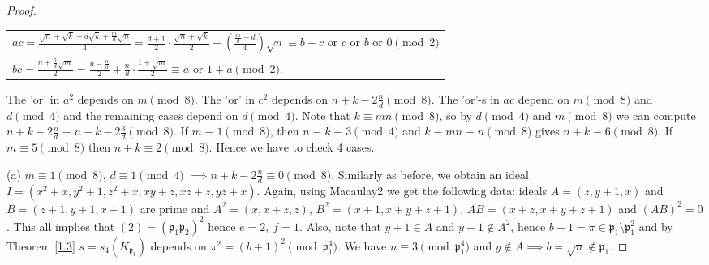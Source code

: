 \documentclass[12pt]{article}
\theoremstyle{remark}
\begin{document}
\begin{proof}
\begin{center}
\begin{tabular}{@{}l@{}}
$ac = \frac{\sqrt{n} + \sqrt{k} + d\sqrt{k} + \frac{m}{d} \sqrt{n} }{4} =  \frac{d+1}{2} \cdot \frac{\sqrt{n}+\sqrt{k}}{2} + (\frac{\frac{m}{d}-d}{4})\sqrt{n} \equiv b+c \text{ or } c \text{ or } b \text{ or } 0 \pmod{2}$\\
$bc = \frac{n + \frac{n}{d}\sqrt{m}}{2} = \frac{n - \frac{n}{d}}{2} + \frac{n}{d} \cdot \frac{1+ \sqrt{m}}{2} \equiv a \text{ or }  1 + a \pmod{2}.$
\end{tabular}
\end{center}
The 'or' in $a^2$ depends on $m \pmod{8}$. The 'or' in $c^2$ depends on $n+k-2\frac{n}{d} \pmod{8}$. The 'or'-s in $ac$ depend on $m \pmod{8}$ and $d \pmod{4}$ and the remaining cases depend on $d \pmod{4}$. Note that $k \equiv mn \pmod{8}$, so by $d \pmod{4}$ and $m \pmod{8}$ we can compute $n+k-2\frac{n}{d} \equiv n+k-2\frac{3}{d} \pmod{8}$. If $m\equiv 1\pmod{8}$, then $n \equiv k \equiv 3 \pmod{4}$ and $k \equiv mn \equiv n \pmod{8}$ gives $n+k \equiv 6 \pmod{8}$. If $m \equiv 5 \pmod{8}$ then $n+k \equiv 2 \pmod{8}$. Hence we have to check 4 cases.


(a) $m \equiv 1 \pmod{8}$, $d \equiv 1 \pmod{4}$ $ \implies n+k-2\frac{n}{d} \equiv 0 \pmod{8}$. Similarly as before, we obtain an ideal $I = (x^2+x,y^2+1,z^2+x,xy+z,xz+z,yz+x)$. Again, using Macaulay2 we get the following data: ideals $A = (z,y+1,x)$ and $B = (z+1,y+1,x+1)$ are prime and $A^2 = (x,x+z,z)$, $B^2 = (x+1,x+y+z+1)$, $AB = (x+z,x+y+z+1)$ and $(AB)^2 = 0$. This all implies that $(2)=(\mathfrak{p}_1\mathfrak{p}_2)^2$ hence $ e=2, \ f=1$. Also, note that $y+1 \in A$ and $y+1 \not\in A^2$, hence $b+1 = \pi \in \mathfrak{p}_1 \setminus \mathfrak{p}_1^2$ and by Theorem \ref{1.3} $s = s_4(K_{\mathfrak{p}_1})$ depends on $\pi^2 = (b+1)^2 \pmod{\mathfrak{p}_1^4}$. We have $n \equiv 3 \pmod{\mathfrak{p}_1^4}$ and $y \not\in A \implies b = \sqrt{n} \not\in \mathfrak{p}_1$. 


\end{proof}
\end{document}
